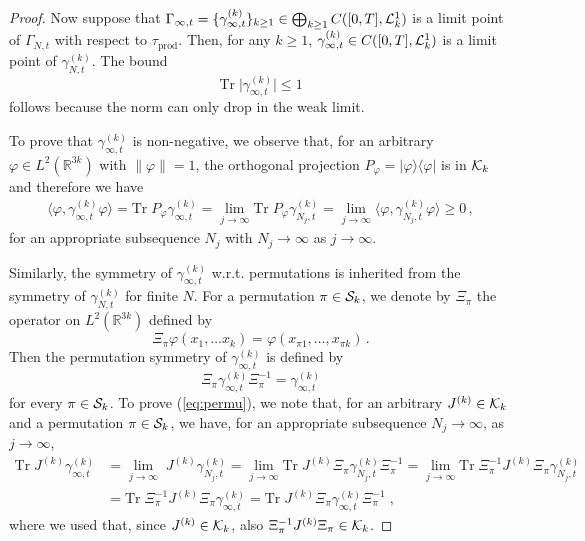 \documentclass[11pt]{article}
\newcommand{\ph}{\varphi}
\newcommand{\bR}{{\mathbb R}}
\newcommand{\tr}{\mbox{Tr}}
\newcommand{\cS}{{\cal S}}
\newcommand{\cK}{{\cal K}}
\newcommand{\cL}{{\cal L}}
\begin{document}
\begin{proof}
\medskip

 Now suppose that $
\Gamma_{\infty,t} = \{  \gamma^{(k)}_{\infty,t} \}_{k \geq 1}
\in\bigoplus_{k\geq 1} C([0,T], \cL^1_k)$ is a limit point of $
\Gamma_{N,t}$ with respect to $\tau_{\text{prod}}$. Then, for any
$k\geq 1$, $ \gamma_{\infty,t}^{(k)} \in C([0,T], \cL^1_k)$ is a
limit point of $ \gamma_{N,t}^{(k)}$. The bound
\[ \tr \; \Big|  \gamma_{\infty,t}^{(k)}\Big| \leq 1 \] follows
because the norm can only drop in the weak limit.


 To prove that $ \gamma^{(k)}_{\infty,t}$
is non-negative, we observe that, for an arbitrary $\ph \in L^2
(\bR^{3k})$ with $\| \ph \| =1$, the orthogonal projection $P_{\ph}
= |\ph \rangle\langle \ph |$ is in $\cK_k$ and therefore we have
\begin{equation}
\begin{split}
\langle \ph ,  \gamma^{(k)}_{\infty,t} \ph \rangle = \tr \; P_{\ph}
 \gamma^{(k)}_{\infty,t} = \lim_{j \to \infty} \tr \; P_{\ph}
\gamma^{(k)}_{N_j,t} = \lim_{j \to \infty} \langle \ph,
\gamma^{(k)}_{N_j ,t} \ph \rangle \geq 0 \, ,
\end{split}
\end{equation}
for an appropriate subsequence $N_j$ with $N_j \to \infty$ as $j \to
\infty$.

 Similarly, the symmetry of $ \gamma^{(k)}_{\infty,t}$
w.r.t. permutations is inherited from the symmetry of $
\gamma^{(k)}_{N,t}$ for finite $N$. For a permutation $\pi \in
\cS_k$, we denote by $\Xi_{\pi}$ the operator on $L^2 (\bR^{3k})$
defined by
\[ \Xi_{\pi} \ph (x_1, \dots x_k) = \ph (x_{\pi 1}, \dots , x_{\pi
k}) \,. \] Then the permutation symmetry of $
\gamma_{\infty,t}^{(k)}$ is defined by
\begin{equation}\label{eq:permu}
\Xi_{\pi}  \gamma^{(k)}_{\infty,t} \Xi_{\pi}^{-1} =
\gamma_{\infty,t}^{(k)}
\end{equation}
for every $\pi \in \cS_k$. To prove (\ref{eq:permu}), we note that,
for an arbitrary $J^{(k)} \in \cK_k$ and a permutation $\pi \in
\cS_k$, we have, for an appropriate subsequence $N_j \to \infty$, as
$j \to \infty$,
\begin{equation}
\begin{split}
\tr \; J^{(k)}  \gamma^{(k)}_{\infty,t} &= \lim_{j \to \infty} \;
J^{(k)}  \gamma^{(k)}_{N_j ,t} = \lim_{j \to \infty} \tr \; J^{(k)}
\Xi_{\pi}  \gamma^{(k)}_{N_j ,t} \Xi_{\pi}^{-1} = \lim_{j \to
\infty} \tr \; \Xi_{\pi}^{-1} J^{(k)} \Xi_{\pi}  \gamma_{N_j
,t}^{(k)} \\ &= \tr \; \Xi_{\pi}^{-1} J^{(k)} \Xi_{\pi}
\gamma_{\infty,t}^{(k)} = \tr \; J^{(k)} \Xi_{\pi}
\gamma_{\infty,t}^{(k)} \Xi_{\pi}^{-1} \; ,
\end{split}
\end{equation}
where we used that, since $J^{(k)} \in \cK_k$, also $\Xi_{\pi}^{-1}
J^{(k)} \Xi_{\pi} \in \cK_k$.
\end{proof}
\end{document}
